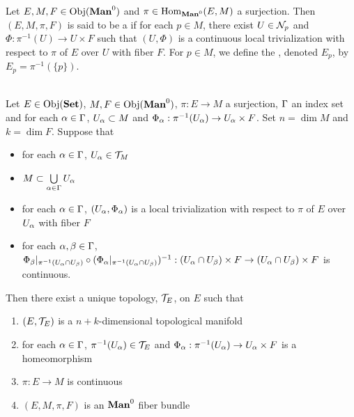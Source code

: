 \documentclass{book}
\begin{document}
	\begin{defn} 
		Let $E,M, F \in \Obj(\Man0)$ and $\pi \in \Hom_{\Man0}(E, M)$ a surjection. Then $(E, M, \pi, F)$ is said to be a  if for each $p \in M$, there exist $U \in \mathcal{N}_p$ and $\Phi: \pi^{-1}(U) \rightarrow U \times F$ such that $(U, \Phi)$ is a continuous local trivialization with respect to $\pi$ of $E$ over $U$ with fiber $F$. For $p \in M$, we define the , denoted $E_p$, by $E_p = \pi^{-1}(\{p\})$.
	\end{defn}

	\begin{ex}   \\
		Let $E \in \operatorname{Obj}(\operatorname*{\text{\textbf{Set}}})$, $M, F \in \Obj(\Man0)$, $\pi: E \rightarrow M$ a surjection, $\Gamma$ an index set and for each $\alpha \in \Gamma$, $U_{\alpha} \subset M$ and $\Phi_{\alpha}: \pi^{-1}(U_{\alpha}) \rightarrow U_{\alpha} \times F$. Set $n = \dim M$ and $k = \dim F$. Suppose that 
		\begin{itemize}
			\item for each $\alpha \in \Gamma$, $U_{\alpha} \in \mathcal{T}_M$
			\item $M \subset \bigcup\limits_{\alpha \in \Gamma} U_{\alpha}$ 
			\item for each $\alpha \in \Gamma$, $(U_{\alpha}, \Phi_{\alpha})$ is a local trivialization with respect to $\pi$ of $E$ over $U_{\alpha}$ with fiber $F$ 
			\item for each $\alpha,\beta \in \Gamma$, $\Phi_{\beta}|_{\pi^{-1}(U_{\alpha} \cap U_{\beta})} \circ (\Phi_{\alpha}|_{\pi^{-1}(U_{\alpha} \cap U_{\beta})})^{-1}: (U_{\alpha} \cap U_{\beta}) \times F \rightarrow  (U_{\alpha} \cap U_{\beta}) \times F$ is continuous.
		\end{itemize}
		Then there exist a unique topology, $\mathcal{T}_E$, on $E$ such that
		\begin{enumerate}
			\item $(E, \mathcal{T}_E)$ is a $n+k$-dimensional topological manifold 
			\item for each $\alpha \in \Gamma$, $ \pi^{-1}(U_{\alpha}) \in \mathcal{T}_E$ and $\Phi_{\alpha}: \pi^{-1}(U_{\alpha}) \rightarrow U_{\alpha} \times F$ is a homeomorphism
			\item $\pi: E \rightarrow M$ is continuous
			\item $(E, M, \pi, F)$ is an $\Man0$ fiber bundle
		\end{enumerate}
	\end{ex}
	
\end{document}
